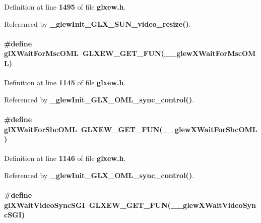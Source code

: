 Definition at line {\bf 1495} of file {\bf glxew.\+h}.



Referenced by {\bf \+\_\+glew\+Init\+\_\+\+G\+L\+X\+\_\+\+S\+U\+N\+\_\+video\+\_\+resize()}.

\paragraph[{gl\+X\+Wait\+For\+Msc\+O\+ML}]{\setlength{\rightskip}{0pt plus 5cm}\#define gl\+X\+Wait\+For\+Msc\+O\+ML~{\bf G\+L\+X\+E\+W\+\_\+\+G\+E\+T\+\_\+\+F\+UN}({\bf \+\_\+\+\_\+glew\+X\+Wait\+For\+Msc\+O\+ML})}\label{glxew_8h_a2e81853a29ba7109d76253cadcee4b5e}


Definition at line {\bf 1145} of file {\bf glxew.\+h}.



Referenced by {\bf \+\_\+glew\+Init\+\_\+\+G\+L\+X\+\_\+\+O\+M\+L\+\_\+sync\+\_\+control()}.

\paragraph[{gl\+X\+Wait\+For\+Sbc\+O\+ML}]{\setlength{\rightskip}{0pt plus 5cm}\#define gl\+X\+Wait\+For\+Sbc\+O\+ML~{\bf G\+L\+X\+E\+W\+\_\+\+G\+E\+T\+\_\+\+F\+UN}({\bf \+\_\+\+\_\+glew\+X\+Wait\+For\+Sbc\+O\+ML})}\label{glxew_8h_a9c4de6b8312697597d6a8c404f73df6d}


Definition at line {\bf 1146} of file {\bf glxew.\+h}.



Referenced by {\bf \+\_\+glew\+Init\+\_\+\+G\+L\+X\+\_\+\+O\+M\+L\+\_\+sync\+\_\+control()}.

\paragraph[{gl\+X\+Wait\+Video\+Sync\+S\+GI}]{\setlength{\rightskip}{0pt plus 5cm}\#define gl\+X\+Wait\+Video\+Sync\+S\+GI~{\bf G\+L\+X\+E\+W\+\_\+\+G\+E\+T\+\_\+\+F\+UN}({\bf \+\_\+\+\_\+glew\+X\+Wait\+Video\+Sync\+S\+GI})}\label{glxew_8h_a00091ad4585c8aba70c4e6acc61026b0}


